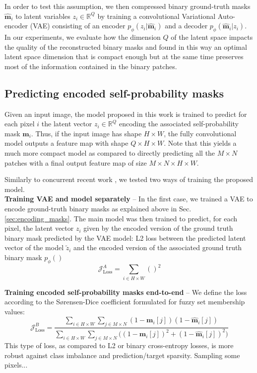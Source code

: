 In order to test this assumption, we then compressed binary ground-truth masks $\hat{\mathbf{m}}_i$ to latent variables $z_i\in \mathbb{R}^Q$ by training a convolutional Variational Auto-encoder (VAE) \cite{kingma2013auto,rezende2014stochastic} consisting of an encoder $p_{\phi}(z_i|\hat{\mathbf{m}}_i)$ and a decoder $p_{\phi}(\hat{\mathbf{m}}_i|z_i)$.
In our experiments, we evaluate how the dimension $Q$ of the latent space impacts the quality of the reconstructed binary masks and found in this way an optimal latent space dimension that is compact enough but at the same time preserves most of the information contained in the binary patches.

\subsection{Predicting encoded self-probability masks} \label{sec:model_and_loss}
Given an input image, the model proposed in this work is trained to predict for each pixel $i$ the latent vector $z_i\in \mathbb{R}^Q$ encoding the associated self-probability mask $\mathbf{m}_i$. Thus, if the input image has shape $H\times W$, the fully convolutional model outputs a feature map with shape $Q\times H\times W$. 
Note that this yields a much more compact model as compared to directly predicting all the $M\times N$ patches with a final output feature map of size $M\times N\times H\times W$.

Similarly to concurrent recent work \cite{hirsch2020patchperpix}, we tested two ways of training the proposed model. \\

\textbf{Training VAE and model separately} -- In the first case, we trained a VAE to encode ground-truth binary masks as explained above in Sec. \ref{sec:encoding_masks}. The main model was then trained to predict, for each pixel, the latent vector $z_i$ given by the encoded version of the ground truth binary mask predicted by the VAE model:
L2 loss between the predicted latent vector of the model $\tilde{z}_i$ and the encoded version of the associated ground truth binary mask $p_{\phi}()$
\begin{equation}
\mathcal{J}^A_{\mathrm{Loss}} = \sum_{i\in H\times W} ()^2
\end{equation}


\textbf{Training encoded self-probability masks end-to-end} --
We define the loss according to the S\o rensen-Dice coefficient \cite{dice1945measures,sorensen1948method} formulated for fuzzy set membership values:
\begin{equation}
\mathcal{J}^B_{\mathrm{Loss}} = \frac{\sum_{i\in H\times W} \sum_{j\in M\times N} (1-\mathbf{m}_i[j])(1-\hat{\mathbf{m}}_i[j])}{\sum_{i\in H\times W} \sum_{j\in M\times N} \big( (1-\mathbf{m}_i[j])^2 + (1-\hat{\mathbf{m}}_i[j])^2 \big)}
\end{equation} 
This type of loss, as compared to L2 or binary cross-entropy losses, is more robust against class imbalance and prediction/target sparsity.
Sampling some pixels...

